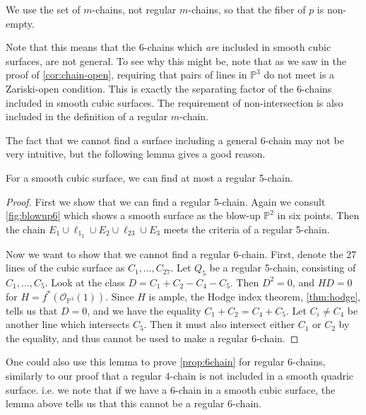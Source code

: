 \begin{remark}
    We use the set of $m$-chains, not regular $m$-chains, so that the fiber of $p$ is non-empty. 
\end{remark}

Note that this means that the 6-chains which \emph{are} included in smooth cubic surfaces, are not general. To see why this might be, note that as we saw in the proof of \cref{cor:chain-open}, requiring that pairs of lines in $\mathbb{P}^3$ do not meet is a Zariski-open condition. This is exactly the separating factor of the 6-chains included in smooth cubic surfaces. The requirement of non-intersection is also included in the definition of a regular $m$-chain.

The fact that we cannot find a surface including a general 6-chain may not be very intuitive, but the following lemma gives a good reason.

\begin{lemma}
    For a smooth cubic surface, we can find at most a regular 5-chain.
\end{lemma}
\begin{proof}
    First we show that we can find a regular 5-chain. Again we consult \cref{fig:blowup6} which shows a smooth surface as the blow-up $\mathbb{P}^2$ in six points. Then the chain $E_1 \cup \ell_{1_2} \cup E_2 \cup \ell_{23} \cup E_3$ meets the criteria of a regular 5-chain.

    Now we want to show that we cannot find a regular 6-chain. First, denote the 27 lines of the cubic surface as $C_1, \dots, C_{27}$. Let $Q_5$ be a regular 5-chain, consisting of $C_1, \dots, C_5$. Look at the class $D = C_1 + C_2 - C_4 - C_5$. Then $D^2 = 0$, and $HD=0$ for $H = f^*(\mathcal{O}_{\mathbb{P}^3}(1))$. Since $H$ is ample, the Hodge index theorem, \cref{thm:hodge}, tells us that $D=0$, and we have the equality $C_1 + C_2 = C_4 + C_5$. Let $C_i \neq C_4$ be another line which intersects $C_5$. Then it must also intersect either $C_1$ or $C_2$ by the equality, and thus cannot be used to make a regular 6-chain.
\end{proof}


One could also use this lemma to prove \cref{prop:6chain} for regular 6-chains, similarly to our proof that a regular 4-chain is not included in a smooth quadric surface. i.e. we note that if we have a 6-chain in a smooth cubic surface, the lemma above tells us that this cannot be a regular 6-chain. 


